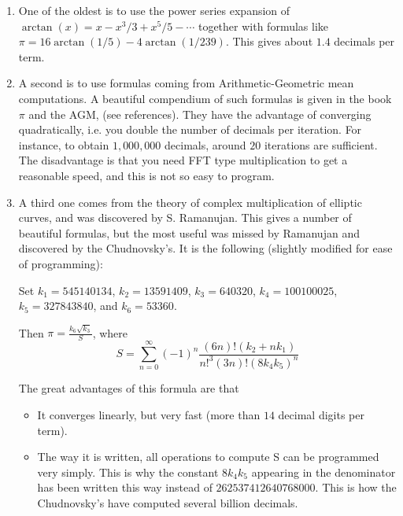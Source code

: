 \begin{enumerate}

  \item One of the oldest is to use the power series expansion of
  $\arctan(x)=x - x^3/3 + x^5/5 - \cdots$ together with formulas like
  $\pi=16\arctan(1/5)-4\arctan(1/239)$. This gives about $1.4$ decimals
  per term.

  \item A second is to use formulas coming from Arithmetic-Geometric
  mean computations. A beautiful compendium of such formulas is given in
  the book $\pi$ and the AGM, (see references).  They have the advantage
  of converging quadratically, i.e. you double the number of decimals
  per iteration.  For instance, to obtain $1,000,000$ decimals, around
  $20$ iterations are sufficient. The disadvantage is that you need FFT
  type multiplication to get a reasonable speed, and this is not so easy
  to program.

  \item A third one comes from the theory of complex multiplication of
  elliptic curves, and was discovered by S. Ramanujan. This gives a
  number of beautiful formulas, but the most useful was missed by
  Ramanujan and discovered by the Chudnovsky's. It is the following
  (slightly modified for ease of programming):

  Set $k_1 = 545140134$, $k_2 = 13591409$, $k_3 = 640320$, $k_4 =
  100100025$, $k_5 = 327843840$, and $k_6 = 53360$.

  Then $\pi = \frac{k_6 \sqrt{k_3}}{S}$, where
  \[
  S = \sum_{n=0}^\infty (-1)^n\frac{(6n)!(k_2+nk_1)}{n!^3(3n)!(8k_4k_5)^n}
  \]

  The great advantages of this formula are that

  \begin{itemize}
    \item It converges linearly, but very fast (more than $14$ decimal
    digits per term).

    \item The way it is written, all operations to compute S can be
    programmed very simply. This is why the constant $8k_4k_5$ appearing
    in the denominator has been written this way instead of
    $262537412640768000$.  This is how the Chudnovsky's have computed
    several billion decimals.
  \end{itemize}
\end{enumerate}


